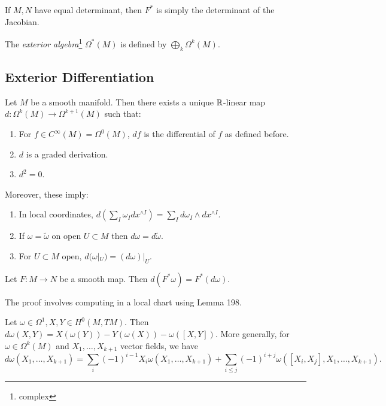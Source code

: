 \documentclass[twoside, 10pt]{article}
\begin{document}
    \begin{prop}
        If $M,N$ have equal determinant, then $F^*$ is simply the determinant of the Jacobian.
    \end{prop}

    \begin{defn}
        The \textit{exterior algebra}\footnote{complex} $\Omega^*(M)$ is defined by $\bigoplus_k \Omega^k(M)$.
    \end{defn}

    \subsection{Exterior Differentiation}%
    \label{sub:exterior_differentiation}
    
    \begin{thm}
        Let $M$ be a smooth manifold. Then there exists a unique $\mathbb{R}$-linear map $d: \Omega^k(M) \to \Omega^{k+1}(M)$ such that:
        \begin{enumerate}
            \item For $f \in C^{\infty}(M) = \Omega^0(M)$, $df$ is the differential of $f$ as defined before.
            \item $d$ is a graded derivation.
            \item $d^2 = 0$.
        \end{enumerate}
        Moreover, these imply:
        \begin{enumerate}[label=(\alph*)]
            \item In local coordinates, $d \left( \sum_I \omega_I dx^{\wedge I} \right) = \sum_I d\omega_I \wedge dx^{\wedge I}$.
            \item If $\omega = \widetilde{\omega}$ on open $U \subset M$ then $d\omega = d\widetilde{\omega}$.
            \item For $U \subset M$ open, $d(\omega |_U) = (d\omega)|_U$.
        \end{enumerate}
    \end{thm}
    
    \begin{lem}
        Let $F:M \to N$ be a smooth map. Then $d(F^*\omega) = F^*(d\omega)$.
    \end{lem}

    The proof involves computing in a local chart using Lemma 198.

    \begin{prop}
        Let $\omega \in \Omega^1, X,Y \in H^0(M,TM)$. Then $d \omega(X,Y) = X(\omega(Y)) - Y(\omega(X)) - \omega([X,Y])$. More generally, for $\omega \in \Omega^k(M)$ and $X_1, \ldots, X_{k+1}$ vector fields, we have
        \[ d\omega(X_1, \ldots, X_{k+1}) = \sum_i (-1)^{i-1} X_i \omega(X_1, \ldots, X_{k+1}) + \sum_{i\leq j} (-1)^{i+j} \omega([X_i,X_j], X_1, \ldots, X_{k+1}). \]
    \end{prop}
\end{document}
